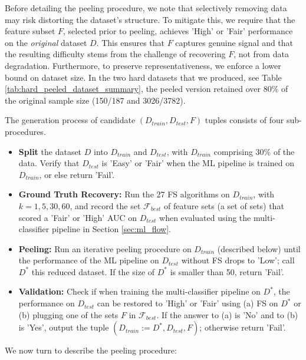 \documentclass[preprint,12pt,authoryear]{elsarticle}
\begin{document}
Before detailing the peeling procedure, we note that selectively removing data may risk distorting the dataset’s structure. To mitigate this, we require that the feature subset \(F\), selected prior to peeling, achieves 'High' or 'Fair' performance on the \emph{original} dataset \(D\). This ensures that \(F\) captures genuine signal and that the resulting difficulty stems from the challenge of recovering \(F\), not from data degradation. Furthermore, to preserve representativeness, we enforce a lower bound on dataset size. In the two hard datasets that we produced, see Table \ref{tab:hard_peeled_dataset_summary}, the peeled version retained over 80\% of the original sample size (150/187 and 3026/3782).



\vspace{2mm}


The generation process of candidate $(D_{train},D_{test},F)$ tuples consists of four sub-procedures.
\begin{itemize}
    \item {\bf Split} the dataset $D$ into $D_{train}$ and $D_{test}$, with $D_{train}$ comprising   30\% of the data. Verify that $D_{test}$ is 'Easy' or 'Fair' when the ML pipeline is trained on $D_{train}$, or else return 'Fail'.


\item {\bf Ground Truth Recovery:} Run the 27 FS algorithms on $D_{train}$, with $k=1,5,30,60$, and record the set $\mathcal{F}_{best}$ of feature sets (a set of sets) that scored a 'Fair' or 'High' AUC on $D_{test}$ when evaluated using the multi-classifier pipeline in Section \ref{sec:ml_flow}.

     
    \item {\bf Peeling:} Run an iterative peeling procedure on $D_{train}$ (described below) until the performance of the ML pipeline on $D_{test}$ without FS drops to 'Low'; call $D^*$ this reduced dataset. If the size of $D^*$ is smaller than 50, return 'Fail'.
    \item {\bf Validation:} Check if when training the multi-classifier pipeline on $D^*$, the performance on $D_{test}$ can be restored to 'High' or 'Fair' using (a) FS on $D^*$ or (b) plugging one of the sets $F$ in $\mathcal{F}_{best}$. If the answer to (a) is 'No' and to (b) is 'Yes', output the tuple $(D_{train}:=D^*, D_{test},F)$; otherwise return 'Fail'.
\end{itemize}

 
We now turn to describe the peeling procedure:
\end{document}
